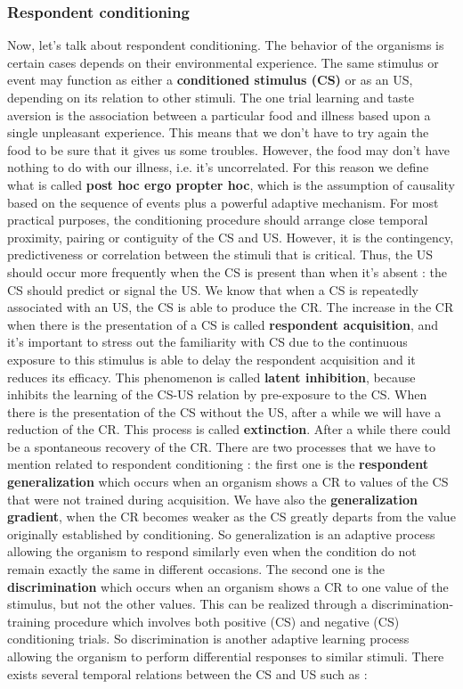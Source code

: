 \documentclass[11pt]{article}
\begin{document}
\subsubsection{Respondent conditioning}
Now, let's talk about respondent conditioning. The behavior of the organisms is certain cases depends on their environmental experience. The same stimulus or event may function as either a \textbf{conditioned stimulus (CS)} or as an US, depending on its relation to other stimuli. The one trial learning and taste aversion is the association between a particular food and illness based upon a single unpleasant experience. This means that we don't have to try again the food to be sure that it gives us some troubles. However, the food may don't have nothing to do with our illness, i.e. it's uncorrelated. For this reason we define what is called \textbf{post hoc ergo propter hoc}, which is the assumption of causality based on the sequence of events plus a powerful adaptive mechanism. For most practical purposes, the conditioning procedure should arrange close temporal proximity, pairing or contiguity of the CS and US. However, it is the contingency, predictiveness or correlation between the stimuli that is critical. Thus, the US should occur more frequently when the CS is present than when it's absent : the CS should predict or signal the US. We know that when a CS is repeatedly associated with an US, the CS is able to produce the CR. The increase in the CR when there is the presentation of a CS is called \textbf{respondent acquisition}, and it's important to stress out the familiarity with CS due to the continuous exposure to this stimulus is able to delay the respondent acquisition and it reduces its efficacy. This phenomenon is called \textbf{latent inhibition}, because inhibits the learning of the CS-US relation by pre-exposure to the CS. When there is the presentation of the CS without the US, after a while we will have a reduction of the CR. This process is called \textbf{extinction}. After a while there could be a spontaneous recovery of the CR. There are two processes that we have to mention related to respondent conditioning : the first one is the \textbf{respondent generalization} which occurs when an organism shows a CR to values of the CS that were not trained during acquisition. We have also the \textbf{generalization gradient}, when the CR becomes weaker as the CS greatly departs from the value originally established by conditioning. So generalization is an adaptive process allowing the organism to respond similarly even when the condition do not remain exactly the same in different occasions. The second one is the \textbf{discrimination} which occurs when an organism shows a CR to one value of the stimulus, but not the other values. This can be realized through a discrimination-training procedure which involves both positive (CS) and negative (CS) conditioning trials. So discrimination is another adaptive learning process allowing the organism to perform differential responses to similar stimuli. There exists several temporal relations between the CS and US such as :
\end{document}

